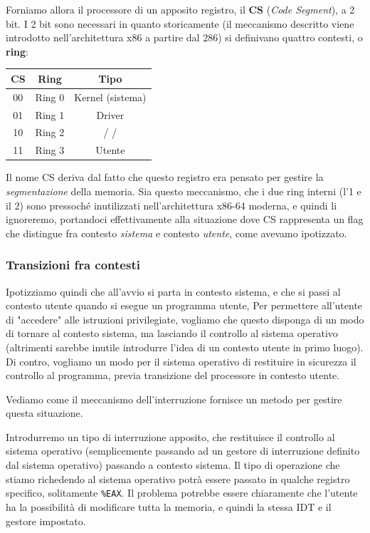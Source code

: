 \documentclass[a4paper,11pt]{article}
\begin{document}
Forniamo allora il processore di un apposito registro, il \textbf{CS} (\textit{Code Segment}), a 2 bit.
I 2 bit sono necessari in quanto storicamente (il meccanismo descritto viene introdotto nell'architettura x86 a partire dal 286) si definivano quattro contesti, o \textbf{ring}:
\begin{table}[h!]
	\center {}
	\begin{tabular} { c | c | c }
		\bfseries CS & \bfseries Ring & \bfseries Tipo \\
		\hline 
		00 & Ring 0 & Kernel (sistema) \\
		01 & Ring 1 & Driver \\
		10 & Ring 2 &  / / \\
		11 & Ring 3 & Utente \\
	\end{tabular}
\end{table}

Il nome CS deriva dal fatto che questo registro era pensato per gestire la \textit{segmentazione} della memoria.
Sia questo meccanismo, che i due ring interni (l'1 e il 2) sono pressoché inutilizzati nell'architettura x86-64 moderna, e quindi li ignoreremo, portandoci effettivamente alla situazione dove CS rappresenta un flag che distingue fra contesto \textit{sistema} e contesto \textit{utente}, come avevamo ipotizzato.

\subsubsection{Transizioni fra contesti}
Ipotizziamo quindi che all'avvio si parta in contesto sistema, e che si passi al contesto utente quando si esegue un programma utente, 
Per permettere all'utente di "accedere" alle istruzioni privilegiate, vogliamo che questo disponga di un modo di tornare al contesto sistema, ma lasciando il controllo al sistema operativo (altrimenti sarebbe inutile introdurre l'idea di un contesto utente in primo luogo).
Di contro, vogliamo un modo per il sistema operativo di restituire in sicurezza il controllo al programma, previa transizione del processore in contesto utente.

Vediamo come il meccanismo dell'interruzione fornisce un metodo per gestire questa situazione.

Introdurremo un tipo di interruzione apposito, che restituisce il controllo al sistema operativo (semplicemente passando ad un gestore di interruzione definito dal sistema operativo) passando a contesto sistema.
Il tipo di operazione che stiamo richedendo al sistema operativo potrà essere passato in qualche registro specifico, solitamente \lstinline|%EAX|.
Il problema potrebbe essere chiaramente che l'utente ha la possibilità di modificare tutta la memoria, e quindi la stessa IDT e il gestore impostato.
\end{document}
